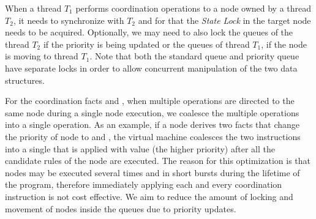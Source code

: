 When a thread $T_1$ performs coordination operations to a node owned by a thread
$T_2$, it needs to synchronize with $T_2$ and for that the \emph{State Lock} in
the target node needs to be acquired. Optionally, we may need to also lock the
queues of the thread $T_2$ if the priority is being updated or the queues of
thread $T_1$, if the node is moving to thread $T_1$. Note that both the standard
queue and priority queue have separate locks in order to allow concurrent
manipulation of the two data structures.

For the coordination facts  and , when
multiple operations are directed to the same node during a single node
execution, we coalesce the multiple operations into a single operation.  As an
example, if a node derives two  facts that change the
priority of node  to  and , the virtual machine
coalesces the two instructions into a single  that is applied
with value  (the higher priority) after all the candidate rules of the
node are executed. The reason for this optimization is that nodes may be
executed several times and in short bursts during the lifetime of the program,
therefore immediately applying each and every coordination instruction is not
cost effective. We aim to reduce the amount of locking and movement of nodes
inside the queues due to priority updates.
